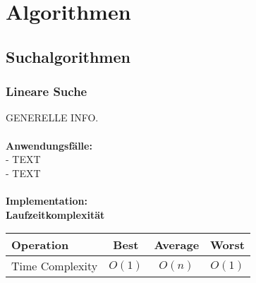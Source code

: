 \documentclass[../main.tex]{subfiles}
\begin{document}
	
	\section{Algorithmen}

	\subsection{Suchalgorithmen}
	\subsubsection{Lineare Suche}
	GENERELLE INFO. \\\\
	\textbf{Anwendungsfälle:}\\
		- TEXT\\
		- TEXT\\\\
	\textbf{Implementation:}\\
	 
	\textbf{Laufzeitkomplexität}\\
	\begin{table}[ht]
		\centering
		\begin{tabular}{l *{3}{c}}
			\toprule
			Operation & Best & Average & Worst\\
			\midrule
			Time Complexity & $O(1)$ & $O(n)$ & $O(1)$\\
			\bottomrule
		\end{tabular}
	\end{table}
	\clearpage
	
\end{document}
